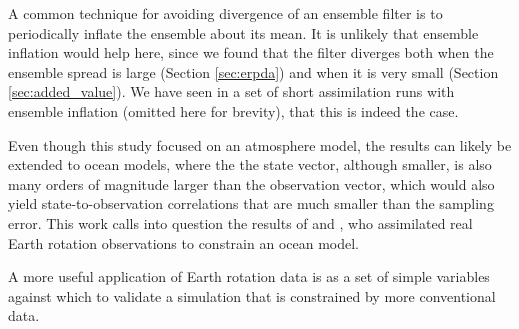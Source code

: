 A common technique for avoiding divergence of an ensemble filter is to periodically inflate the ensemble about its mean. 
It is unlikely that ensemble inflation would help here, since we found that the filter diverges both when the ensemble spread is large (Section \ref{sec:erpda}) and when it is very small (Section \ref{sec:added_value}). 
We have seen in a set of short assimilation runs with ensemble inflation (omitted here for brevity), that this is indeed the case. 


Even though this study focused on an atmosphere model, the results can likely be extended to ocean models, where the the state vector, although smaller, is also many orders of magnitude larger than the observation vector, which would also yield state-to-observation correlations that are much smaller than the sampling error. 
This work calls into question the results of \citet{Saynisch2010,Saynisch2011} and \citet{Saynisch2012}, who assimilated real Earth rotation observations to constrain an ocean model. 

A more useful application of Earth rotation data is as a set of simple variables against which to validate a simulation that is constrained by more conventional data.  



